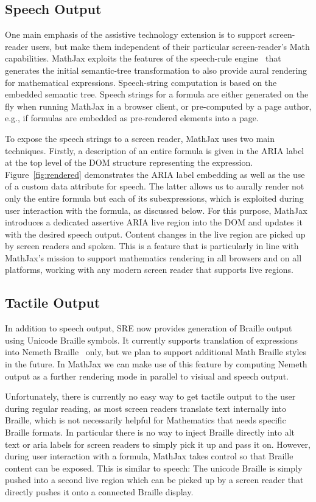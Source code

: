 \documentclass{sig-alternate}
\begin{document}
\subsection{Speech Output}

One main emphasis of the assistive technology extension is to support
screen-reader users, but make them independent of their particular
screen-reader's Math capabilities. MathJax exploits the features of the
speech-rule engine~\cite{Sorge14,SRE} that generates the initial semantic-tree
transformation to also provide aural rendering for mathematical
expressions. Speech-string computation is based on the embedded semantic
tree. Speech strings for a formula are either generated on the fly when running
MathJax in a browser client, or pre-computed by a page author, e.g.,
if formulas are embedded as pre-rendered elements into a page.

To expose the speech strings to a screen reader, MathJax uses two main
techniques.  Firstly, a description of an entire formula is given in the ARIA
label at the top level of the DOM structure representing the expression.
Figure~\ref{fig:rendered} demonstrates the ARIA label embedding as well as the
use of a custom data attribute for speech. The latter allows us to aurally
render not only the entire formula but each of its subexpressions, which is
exploited during user interaction with the formula, as discussed below.  For
this purpose, MathJax introduces a dedicated assertive ARIA live region into the
DOM and updates it with the desired speech output. Content changes in the live region
are picked up by screen readers and spoken. This is a feature that is
particularly in line with MathJax's mission to support mathematics
rendering in all browsers and on all platforms, working with any modern screen
reader that supports live regions.


\subsection{Tactile Output}

In addition to speech output, SRE now provides generation of Braille
output using Unicode Braille symbols. It currently supports translation of
expressions into Nemeth Braille~\cite{nemeth1972nemeth} only, but we plan to support
additional Math Braille styles in the future. In MathJax we can make use of this
feature by computing Nemeth output as a further rendering mode in parallel to
visiual and speech output.

Unfortunately, there is currently no easy way to get tactile output to the user
during regular reading, as most screen readers translate text internally into
Braille, which is not necessarily helpful for Mathematics that needs specific
Braille formats. In particular there is no way to inject Braille directly into
alt text or aria labels for screen readers to simply pick it up and pass it on.
However, during user interaction with a formula, MathJax takes control so that
Braille content can be exposed. This is similar to speech: The unicode Braille
is simply pushed into a second live region which can be picked up by a screen
reader that directly pushes it onto a connected Braille display.
\end{document}
